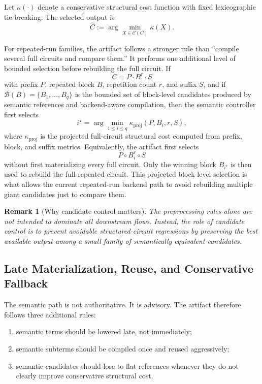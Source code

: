 \documentclass[11pt]{article}
\newtheorem{remark}{Remark}
\begin{document}
Let $\kappa(\cdot)$ denote a conservative structural cost function with fixed lexicographic tie-breaking. The selected output is
\[
\widehat{C} := \arg\min_{X \in \mathcal{C}(C)} \kappa(X).
\]

For repeated-run families, the artifact follows a stronger rule than
``compile several full circuits and compare them.'' It performs one additional
level of bounded selection before rebuilding the full circuit. If
\[
C = P \cdot B^r \cdot S
\]
with prefix $P$, repeated block $B$, repetition count $r$, and suffix $S$, and if $\mathcal{B}(B)=\{B_1,\dots,B_q\}$ is the bounded set of block-level candidates produced by semantic references and backend-aware compilation, then the semantic controller first selects
\[
i^\star = \arg\min_{1 \le i \le q} \kappa_{\mathrm{proj}}(P,B_i,r,S),
\]
where $\kappa_{\mathrm{proj}}$ is the projected full-circuit structural cost computed from prefix, block, and suffix metrics. Equivalently, the artifact first selects
\[
P \circ B_i^r \circ S
\]
without first materializing every full circuit. Only the winning block $B_{i^\star}$ is then used to rebuild the full repeated circuit. This projected block-level selection is what allows the current repeated-run backend path to avoid rebuilding multiple giant candidates just to compare them.

\begin{remark}[Why candidate control matters]
The preprocessing rules alone are not intended to dominate all downstream flows. Instead, the role of candidate control is to prevent avoidable structured-circuit regressions by preserving the best available output among a small family of semantically equivalent candidates.
\end{remark}

\subsection{Late Materialization, Reuse, and Conservative Fallback}

The semantic path is not authoritative. It is advisory. The artifact therefore
follows three additional rules:
\begin{enumerate}[leftmargin=1.5em]
    \item semantic terms should be lowered late, not immediately;
    \item semantic subterms should be compiled once and reused aggressively;
    \item semantic candidates should lose to flat references whenever they do not clearly improve conservative structural cost.
\end{enumerate}
\end{document}
